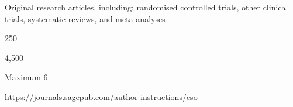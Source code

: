 Original research articles, including: randomised controlled trials, other clinical trials, systematic reviews, and meta-analyses

250

4,500

Maximum 6

https://journals.sagepub.com/author-instructions/eso